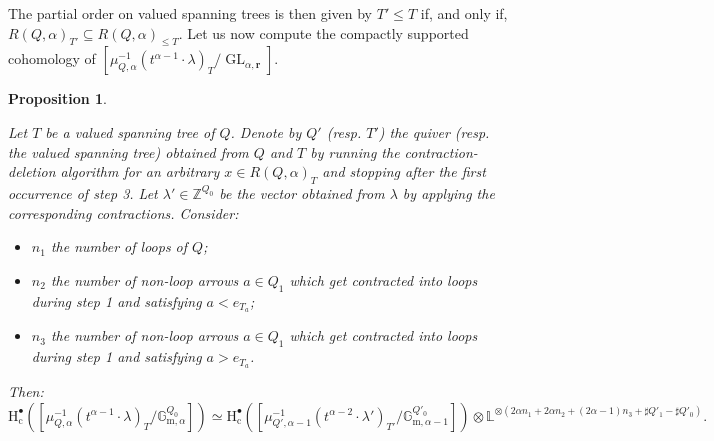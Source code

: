 \documentclass[11pt,english]{article}
\numberwithin{equation}{section}
\numberwithin{figure}{section}
\theoremstyle{definition}
\theoremstyle{plain}
\newtheorem{prop}[df]{Proposition}
\theoremstyle{remark}
\DeclareMathOperator{\GL}{GL}
\newcommand\rr{\mathbf{r}}
\newcommand\HH{\mathrm{H}}
\newcommand\ZZ{\mathbb{Z}}
\begin{document}
The partial order on valued spanning trees is then given by $T'\leq T$
if, and only if, $R(Q,\alpha)_{T'}\subseteq R(Q,\alpha)_{\leq T}$.
Let us now compute the compactly supported cohomology of $\left[\mu_{Q,\alpha}^{-1}(t^{\alpha-1}\cdot\lambda)_{T}/\GL_{\alpha,\rr}\right]$.

\begin{prop} \label{Prop/CohStrat}

Let $T$ be a valued spanning tree of $Q$. Denote by $Q'$ (resp.
$T'$) the quiver (resp. the valued spanning tree) obtained from $Q$
and $T$ by running the contraction-deletion algorithm for an arbitrary
$x\in R(Q,\alpha)_{T}$ and stopping after the first occurrence of
step 3. Let $\lambda'\in\ZZ^{Q_{0}}$ be the vector obtained from
$\lambda$ by applying the corresponding contractions. Consider: 
\begin{itemize}
\item $n_{1}$ the number of loops of $Q$; 
\item $n_{2}$ the number of non-loop arrows $a\in Q_{1}$ which get contracted
into loops during step 1 and satisfying $a<e_{T_{a}}$;
\item $n_{3}$ the number of non-loop arrows $a\in Q_{1}$ which get contracted
into loops during step 1 and satisfying $a>e_{T_{a}}$.
\end{itemize}
Then:\[
\HH_{\mathrm{c}}^{\bullet}\left(\left[\mu_{Q,\alpha}^{-1}(t^{\alpha-1}\cdot\lambda)_T/\mathbb{G}_{\mathrm{m},\alpha}^{Q_0}\right]\right)
\simeq
\HH_{\mathrm{c}}^{\bullet}\left(\left[\mu_{Q',\alpha-1}^{-1}(t^{\alpha-2}\cdot\lambda')_{T'}/\mathbb{G}_{\mathrm{m},\alpha-1}^{Q'_0}\right]\right)
\otimes\mathbb{L}^{\otimes\left(2\alpha n_1+2\alpha n_2+(2\alpha-1)n_3+\sharp Q'_1-\sharp Q'_0\right)}.
\]

\end{prop}
\end{document}
